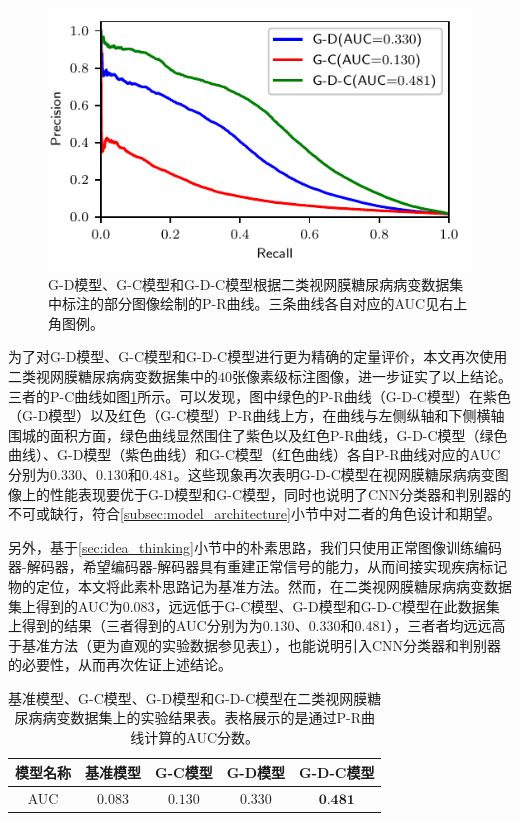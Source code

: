 \begin{figure}[h]
	\centering
	\includegraphics[width=1.0\textwidth]{figure/pr_cureve_u_d_u_c_u_d_c_components.pdf}
	\caption{G-D模型、G-C模型和G-D-C模型根据二类视网膜糖尿病病变数据集中标注的部分图像绘制的P-R曲线。三条曲线各自对应的AUC见右上角图例。} 
	\label{fig:u_d_c_comparation_pr_curve}
\end{figure}

为了对G-D模型、G-C模型和G-D-C模型进行更为精确的定量评价，本文再次使用二类视网膜糖尿病病变数据集中的$40$张像素级标注图像，进一步证实了以上结论。三者的P-C曲线如图\ref{fig:u_d_c_comparation_pr_curve}所示。可以发现，图中绿色的P-R曲线（G-D-C模型）在紫色（G-D模型）以及红色（G-C模型）P-R曲线上方，在曲线与左侧纵轴和下侧横轴围城的面积方面，绿色曲线显然围住了紫色以及红色P-R曲线，G-D-C模型（绿色曲线）、G-D模型（紫色曲线）和G-C模型（红色曲线）各自P-R曲线对应的AUC分别为$0.330$、$0.130$和$0.481$。这些现象再次表明G-D-C模型在视网膜糖尿病病变图像上的性能表现要优于G-D模型和G-C模型，同时也说明了CNN分类器和判别器的不可或缺行，符合\ref{subsec:model_architecture}小节中对二者的角色设计和期望。

另外，基于\ref{sec:idea_thinking}小节中的朴素思路，我们只使用正常图像训练编码器-解码器，希望编码器-解码器具有重建正常信号的能力，从而间接实现疾病标记物的定位，本文将此素朴思路记为基准方法。然而，在二类视网膜糖尿病病变数据集上得到的AUC为$0.083$，远远低于G-C模型、G-D模型和G-D-C模型在此数据集上得到的结果（三者得到的AUC分别为为$0.130$、$0.330$和$0.481$），三者者均远远高于基准方法（更为直观的实验数据参见表\ref{tab:baseline_compared_diabetic_ds}），也能说明引入CNN分类器和判别器的必要性，从而再次佐证上述结论。
\begin{table}[h]
	\centering
	\caption{基准模型、G-C模型、G-D模型和G-D-C模型在二类视网膜糖尿病病变数据集上的实验结果表。表格展示的是通过P-R曲线计算的AUC分数。}		
	\label{tab:baseline_compared_diabetic_ds}
	\begin{tabular}{c|c|c|c|c}
		\toprule[2pt]
		模型名称 & 基准模型 & G-C模型 &G-D模型&G-D-C模型 \\
		\midrule[2pt]
		AUC	& $0.083$&	$0.130$ & $0.330$ & $\textbf{0.481}$	 \\
		\bottomrule[2pt]
	\end{tabular}
\end{table}

